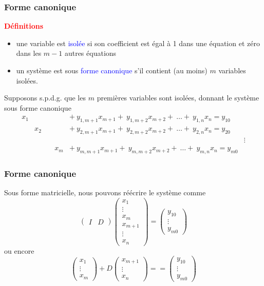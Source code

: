 \documentclass[t,usepdftitle=false]{beamer}
\begin{document}
\begin{frame}
\frametitle{Forme canonique}

\textbf{\textcolor{red}{Définitions}}
\begin{itemize}
\item
une variable est \textcolor{blue}{isolée} si son coefficient est égal à 1 dans une équation et zéro dans les $m-1$ autres équations
\item
un système est sous \textcolor{blue}{forme canonique} s'il contient (au moins) $m$ variables isolées.
\end{itemize}

Supposons s.p.d.g. que les $m$ premières variables sont isolées, donnant le système sous forme canonique
\[
\begin{matrix}
x_1 & & \ & & +\ y_{1,m+1}x_{m+1} +\ y_{1,m+2}x_{m+2} +\ \ldots +\ y_{1,n}x_{n} = y_{10} \\
& x_2 & & & +\ y_{2,m+1}x_{m+1} +\ y_{2,m+2}x_{m+2} +\ \ldots +\ y_{2,n}x_{n} = y_{20} \\
& & & & & \vdots \\
& & & x_m & +\ y_{m,m+1}x_{m+1} +\ y_{m,m+2}x_{m+2} +\ \ldots +\ y_{m,n}x_{n} = y_{m0}
\end{matrix}
\]
\end{frame}

\begin{frame}
\frametitle{Forme canonique}

Sous forme matricielle, nous pouvons réécrire le système comme
$$
\begin{pmatrix}
I &  D
\end{pmatrix}
\begin{pmatrix}
x_1 \\ \vdots \\ x_m \\ x_{m+1} \\ \vdots \\ x_n
\end{pmatrix} =
\begin{pmatrix}
y_{10} \\ \vdots \\ y_{m0}
\end{pmatrix}
$$
ou encore
$$
\begin{pmatrix}
x_1 \\ \vdots \\ x_m
\end{pmatrix}
+
D
\begin{pmatrix}
x_{m+1} \\ \vdots \\ x_n
\end{pmatrix} =
=
\begin{pmatrix}
y_{10} \\ \vdots \\ y_{m0}
\end{pmatrix}
$$
\end{frame}
\end{document}
